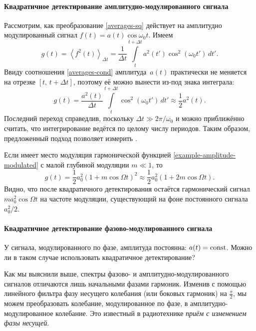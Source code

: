\paragraph{Квадратичное детектирование амплитудно-модулированного сигнала}
Рассмотрим, как преобразование \eqref{averages-sq} действует на
амплитудно модулированный сигнал $f(t) = a(t) \cos \omega_0 t$. Имеем
\begin{equation*}
 g(t) = \left<f^2(t)\right>_{\Delta t} =
 \frac{1}{\Delta t}
\int\limits_{t}^{t+\Delta t} a^2 (t') \cos^2(\omega_0 t')\,dt'.
\end{equation*}
Ввиду соотношения \eqref{averages-cond} амплитуда~$a(t)$ практически не меняется
на отрезке $[t,\,t+\Delta t]$, поэтому её можно вынести из-под знака интеграла:
\begin{equation}
 g(t)= \frac{a^2(t)}{\Delta t} \int\limits_{t}^{t+\Delta t} \cos^2(\omega_0 t')\,dt'\approx
 \frac12 a^2(t).
\end{equation}
Последний переход справедлив, поскольку $\Delta t \gg 2\pi/\omega_0$ и
можно приближённо считать, что интегрирование ведётся по целому числу периодов.
Таким образом, предложенный подход позволяет измерить 
.

Если имеет место модуляция гармонической функцией
\eqref{example-amplitude-modulated}
с малой глубиной модуляции $m\ll 1$, то
\begin{equation*}
 g(t) = \frac12 a_0^2 (1+m\cos\Omega t)^2 \approx
 \frac12 a_0^2 (1+2m\cos\Omega t).
\end{equation*}
Видно, что после квадратичного детектирования остаётся гармонический
сигнал $m a_0^2 \cos\Omega t$ на частоте модуляции, существующий на фоне
постоянного сигнала $a_0^2/2$.

\paragraph{Квадратичное детектирование фазово-модулированного сигнала}
У сигнала, модулированного по фазе, амплитуда постоянна: $a(t)=\mathrm{const}$.
Можно ли в таком случае использовать квадратичное детектирование?

Как мы выяснили выше, спектры фазово- и амплитудно-модулированного сигналов
отличаются лишь начальными фазами гармоник. Изменив с помощью линейного фильтра
фазу несущего колебания (или боковых гармоник) на $\frac{\pi}{2}$,
мы можем преобразовать колебание, модулированное по фазе,
в амплитудно-модулированное колебание. Это известный в
радиотехнике \emph{приём с изменением фазы несущей}.

